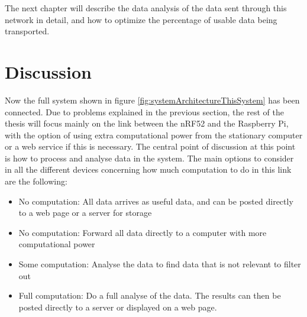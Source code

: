 \noindent The next chapter will describe the data analysis of the data sent through this network in detail, and how to optimize the percentage of usable data being transported.  

\newpage

\section{Discussion}

\noindent Now the full system shown in figure \ref{fig:systemArchitectureThisSystem} has been connected. Due to problems explained in the previous section, the rest of the thesis will focus mainly on the link between the \gls{nRF52} and the \gls{Raspberry Pi}, with the option of using extra computational power from the stationary computer or a web service if this is necessary. The central point of discussion at this point is how to process and analyse data in the system. The main options to consider in all the different devices concerning how much computation to do in this link are the following: 

\begin{itemize}
  \item No computation: All data arrives as useful data, and can be posted directly to a web page or a server for storage
  \item No computation: Forward all data directly to a computer with more computational power
  \item Some computation: Analyse the data to find data that is not relevant to filter out
  \item Full computation: Do a full analyse of the data. The results can then be posted directly to a server or displayed on a web page. 
\end{itemize}

